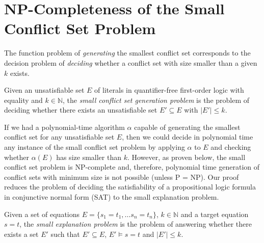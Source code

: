 \documentclass[smallextended]{svjour3}
\begin{document}
\section{NP-Completeness of the Small Conflict Set Problem}
\label{sec:npcomplete}



The function problem of \emph{generating} the smallest conflict set corresponds to 
the decision problem of \emph{deciding} whether a conflict set with 
size smaller than a given $k$ exists.

\begin{definition}
Given an unsatisfiable set $E$ of literals in quantifier-free first-order logic
with equality and $k \in \mathbb{N}$, the \emph{small conflict set generation
  problem} is the problem of deciding whether there exists an unsatisfiable set
$E' \subseteq E$ with $|E'| \leq k$.
\end{definition}

\noindent If we had a polynomial-time algorithm $\alpha$ capable of generating 
the smallest conflict set for any unsatisfiable set $E$, 
then we could decide in polynomial time any instance of the small conflict set 
problem by applying $\alpha$ to $E$ and checking whether $\alpha(E)$ has size smaller than $k$. 
However, as proven below, the small conflict set problem is NP-complete and, therefore, 
polynomial time generation of conflict sets with minimum size is not possible (unless P = NP).
%
Our proof reduces the problem
of deciding the satisfiability of a propositional logic formula in conjunctive
normal form (SAT) to the small explanation problem.
%
\begin{definition}
Given a set of equations $E = \{ s_1=t_1,\ldots s_n=t_n\}$, $k \in
\mathbb{N}$ and a target equation $s = t$, the \emph{small explanation problem}
is the problem of answering whether there exists a set $E'$ such that $E'
\subseteq E$, $E' \models s = t$ and $|E'| \leq k$.
\end{definition}
\end{document}
